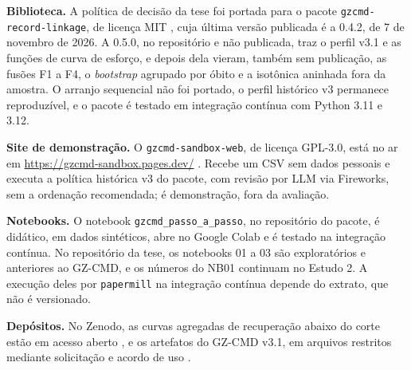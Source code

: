 \documentclass[12pt,a4paper]{article}
\begin{document}
\textbf{Biblioteca.} A política de decisão da tese foi portada para o pacote \texttt{gzcmd-record-\allowbreak linkage}, de licença MIT \cite{Jardim2026gzcmd042}, cuja última versão publicada é a 0.4.2, de 7 de novembro de 2026. A 0.5.0, no repositório e não publicada, traz o perfil v3.1 e as funções de curva de esforço, e depois dela vieram, também sem publicação, as fusões F1 a F4, o \textit{bootstrap} agrupado por óbito e a isotônica aninhada fora da amostra. O arranjo sequencial não foi portado, o perfil histórico v3 permanece reproduzível, e o pacote é testado em integração contínua com Python 3.11 e 3.12. %

\textbf{Site de demonstração.} O \texttt{gzcmd-sandbox-web}, de licença GPL-3.0, está no ar em \url{https://gzcmd-sandbox.pages.dev/} \cite{Jardim2026gzcmdweb13}. Recebe um CSV sem dados pessoais e executa a política histórica v3 do pacote, com revisão por LLM via Fireworks, sem a ordenação recomendada; é demonstração, fora da avaliação. %

\textbf{Notebooks.} O notebook \texttt{gzcmd\_\allowbreak passo\_\allowbreak a\_\allowbreak passo}, no repositório do pacote, é didático, em dados sintéticos, abre no Google Colab e é testado na integração contínua. No repositório da tese, os notebooks 01 a 03 são exploratórios e anteriores ao GZ-CMD, e os números do NB01 continuam no Estudo 2. A execução deles por \texttt{papermill} na integração contínua depende do extrato, que não é versionado. %

\textbf{Depósitos.} No Zenodo, as curvas agregadas de recuperação abaixo do corte estão em acesso aberto \cite{Jardim2026curvasZenodo}, e os artefatos do GZ-CMD v3.1, em arquivos restritos mediante solicitação e acordo de uso \cite{Jardim2026zenodoGzcmd}. %
\end{document}
